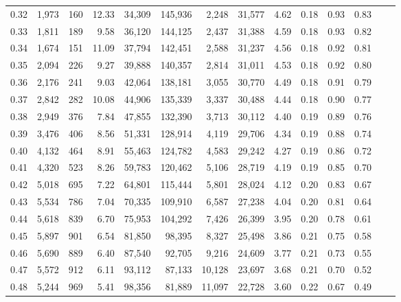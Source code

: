 \begin{tabular}{rrrrrrrrrrrrrr}
0.32 &  1,973 &    160 &   12.33 &   34,309 &  145,936 &   2,248 &  31,577 &  4.62 &  0.18 &  0.93 &      0.83 \\
0.33 &  1,811 &    189 &    9.58 &   36,120 &  144,125 &   2,437 &  31,388 &  4.59 &  0.18 &  0.93 &      0.82 \\
0.34 &  1,674 &    151 &   11.09 &   37,794 &  142,451 &   2,588 &  31,237 &  4.56 &  0.18 &  0.92 &      0.81 \\
0.35 &  2,094 &    226 &    9.27 &   39,888 &  140,357 &   2,814 &  31,011 &  4.53 &  0.18 &  0.92 &      0.80 \\
0.36 &  2,176 &    241 &    9.03 &   42,064 &  138,181 &   3,055 &  30,770 &  4.49 &  0.18 &  0.91 &      0.79 \\
0.37 &  2,842 &    282 &   10.08 &   44,906 &  135,339 &   3,337 &  30,488 &  4.44 &  0.18 &  0.90 &      0.77 \\
0.38 &  2,949 &    376 &    7.84 &   47,855 &  132,390 &   3,713 &  30,112 &  4.40 &  0.19 &  0.89 &      0.76 \\
0.39 &  3,476 &    406 &    8.56 &   51,331 &  128,914 &   4,119 &  29,706 &  4.34 &  0.19 &  0.88 &      0.74 \\
0.40 &  4,132 &    464 &    8.91 &   55,463 &  124,782 &   4,583 &  29,242 &  4.27 &  0.19 &  0.86 &      0.72 \\
0.41 &  4,320 &    523 &    8.26 &   59,783 &  120,462 &   5,106 &  28,719 &  4.19 &  0.19 &  0.85 &      0.70 \\
0.42 &  5,018 &    695 &    7.22 &   64,801 &  115,444 &   5,801 &  28,024 &  4.12 &  0.20 &  0.83 &      0.67 \\
0.43 &  5,534 &    786 &    7.04 &   70,335 &  109,910 &   6,587 &  27,238 &  4.04 &  0.20 &  0.81 &      0.64 \\
0.44 &  5,618 &    839 &    6.70 &   75,953 &  104,292 &   7,426 &  26,399 &  3.95 &  0.20 &  0.78 &      0.61 \\
0.45 &  5,897 &    901 &    6.54 &   81,850 &   98,395 &   8,327 &  25,498 &  3.86 &  0.21 &  0.75 &      0.58 \\
0.46 &  5,690 &    889 &    6.40 &   87,540 &   92,705 &   9,216 &  24,609 &  3.77 &  0.21 &  0.73 &      0.55 \\
0.47 &  5,572 &    912 &    6.11 &   93,112 &   87,133 &  10,128 &  23,697 &  3.68 &  0.21 &  0.70 &      0.52 \\
0.48 &  5,244 &    969 &    5.41 &   98,356 &   81,889 &  11,097 &  22,728 &  3.60 &  0.22 &  0.67 &      0.49 \\

\end{tabular}
